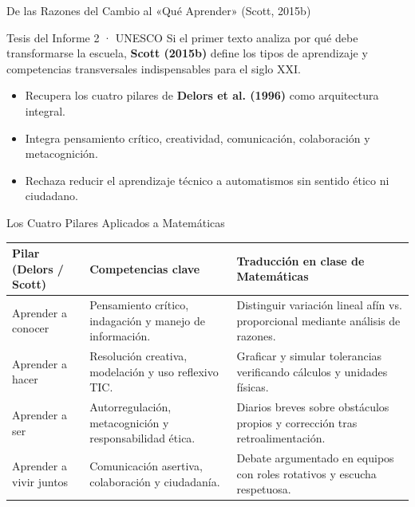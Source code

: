 \documentclass[aspectratio=169,spanish,xcolor=table]{beamer}
\begin{document}
\begin{frame}{De las Razones del Cambio al «Qué Aprender» (Scott, 2015b)}
  \begin{block}{Tesis del Informe 2 · UNESCO}
    Si el primer texto analiza por qué debe transformarse la escuela, \textbf{Scott (2015b)} define los tipos de aprendizaje y competencias transversales indispensables para el siglo XXI.
  \end{block}
  \vspace{0.25cm}
  \begin{itemize}\normalsize
    \item Recupera los cuatro pilares de \textbf{Delors et al. (1996)} como arquitectura integral.
    \item Integra pensamiento crítico, creatividad, comunicación, colaboración y metacognición.
    \item Rechaza reducir el aprendizaje técnico a automatismos sin sentido ético ni ciudadano.
  \end{itemize}
\end{frame}

\begin{frame}{Los Cuatro Pilares Aplicados a Matemáticas}
  \renewcommand{\arraystretch}{1.28}
  \scriptsize
  \begin{tabular}{p{2.9cm}p{5.2cm}p{5.3cm}}
    \toprule
    \textbf{Pilar (Delors / Scott)} & \textbf{Competencias clave} & \textbf{Traducción en clase de Matemáticas} \\
    \midrule
    Aprender a conocer & Pensamiento crítico, indagación y manejo de información. & Distinguir variación lineal afín vs. proporcional mediante análisis de razones. \\
    Aprender a hacer & Resolución creativa, modelación y uso reflexivo TIC. & Graficar y simular tolerancias verificando cálculos y unidades físicas. \\
    Aprender a ser & Autorregulación, metacognición y responsabilidad ética. & Diarios breves sobre obstáculos propios y corrección tras retroalimentación. \\
    Aprender a vivir juntos & Comunicación asertiva, colaboración y ciudadanía. & Debate argumentado en equipos con roles rotativos y escucha respetuosa. \\
    \bottomrule
  \end{tabular}
\end{frame}
\end{document}

